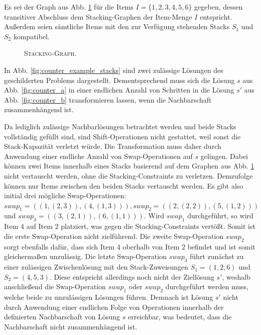 Es sei der Graph aus Abb. \ref{fig:counter_example_stacking_graph} für die Items $I = \{1, 2, 3, 4, 5, 6\}$ gegeben,
dessen transitiver Abschluss dem Stacking-Graphen der Item-Menge $I$ entspricht. Außerdem seien sämtliche
Items mit den zur Verfügung stehenden Stacks $S_1$ und $S_2$ kompatibel.

\vfill
\pagebreak

\begin{figure}[H]
  \centering
  \caption{\textsc{Stacking-Graph}.}
  \label{fig:counter_example_stacking_graph}
\end{figure}

In Abb. \ref{fig:counter_example_stacks} sind zwei zulässige Lösungen des geschilderten Problems dargestellt. Dementsprechend muss
sich die Lösung $s$ aus Abb. \ref{fig:counter_a} in einer endlichen Anzahl von Schritten in die Lösung $s'$ aus
Abb. \ref{fig:counter_b} transformieren lassen, wenn die Nachbarschaft zusammenhängend ist.

Da lediglich zulässige Nachbarlösungen betrachtet werden und beide Stacks vollständig gefüllt sind,
sind Shift-Operationen nicht gestattet, weil sonst die Stack-Kapazität verletzt würde.
Die Transformation muss daher durch Anwendung einer endliche Anzahl von Swap-Operationen auf $s$ gelingen.
Dabei können zwei Items innerhalb eines Stacks basierend auf dem Graphen aus Abb. \ref{fig:counter_example_stacking_graph}  nicht vertauscht werden, ohne die Stacking-Constraints zu verletzen.
Demzufolge können nur Items zwischen den beiden Stacks vertauscht werden. Es gibt also initial drei mögliche
Swap-Operationen: $swap_1 = ((1, (2, 3)), (4, (1, 3))), swap_2 = ((2, (2, 2)), (5, (1, 2)))$ und $swap_3 = ((3, (2, 1)), (6, (1, 1)))$.
Wird $swap_1$ durchgeführt, so wird Item $4$ auf Item $2$ platziert, was gegen die Stacking-Constraints vertößt.
Somit ist die erste Swap-Operation nicht zielführend. Die zweite Swap-Operation $swap_2$ sorgt ebenfalls dafür,
dass sich Item $4$ oberhalb von Item $2$ befindet und ist somit gleichermaßen unzulässig.
Die letzte Swap-Operation $swap_3$ führt zunächst zu einer zulässigen Zwischenlösung mit den Stack-Zuweisungen
$S_1 = (1, 2, 6)$ und $S_2 = (4, 5, 3)$. Diese entspricht allerdings noch nicht der Ziellösung $s'$,
weshalb anschließend die Swap-Operation $swap_1$ oder $swap_2$ durchgeführt werden muss, welche beide zu unzulässigen Lösungen führen. Demnach ist Lösung $s'$ nicht durch Anwendung einer endlichen Folge von Operationen innerhalb der definierten Nachbarschaft von Lösung $s$ erreichbar, was bedeutet, dass die Nachbarschaft nicht zusammenhängend ist.

